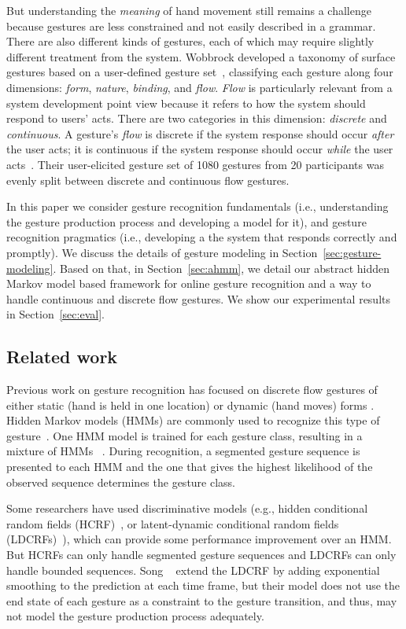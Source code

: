 \documentclass[10pt,twocolumn,letterpaper]{article}
\begin{document}
But understanding the \textit{meaning} of hand movement still remains a challenge because gestures are less constrained and not
easily described in a grammar. There are also different kinds of gestures, each of which may 
require slightly different treatment from the system. Wobbrock \etal developed a taxonomy of surface gestures based on a user-defined
gesture set~\cite{Wobbrock09}, classifying each gesture along four dimensions: 
\textit{form}, \textit{nature}, \textit{binding}, and \textit{flow}. \textit{Flow} is particularly relevant from a system development
point view because it refers to how the system should respond to users' acts. 
There are two categories in this dimension: \textit{discrete} and 
\textit{continuous}. A gesture's \textit{flow} is discrete if the system response
should occur \textit{after} the user acts; it is continuous if the system response
should occur \textit{while} the user acts~\cite{Wobbrock09}. Their user-elicited
gesture set of 1080 gestures from 20 participants was evenly split between discrete and continuous flow 
gestures.

In this paper we consider gesture recognition fundamentals (i.e., understanding the gesture production process and developing a model for it), and 
gesture recognition pragmatics (i.e., developing a 
the system that responds correctly and promptly). We discuss the 
details of gesture modeling in Section~\ref{sec:gesture-modeling}. Based on that, in Section~\ref{sec:ahmm}, we detail 
our abstract hidden Markov model based framework for online gesture recognition and a way to
handle continuous and discrete flow gestures. We show our experimental results in Section~\ref{sec:eval}.

\subsection{Related work}
Previous work on gesture recognition has focused on discrete flow gestures of either
static (hand is held in one location) or dynamic (hand moves) forms \cite{suryanarayan10, song12}. Hidden Markov models (HMMs) are commonly used
to recognize this type of gesture~\cite{Starner95}. 
One HMM model is trained for each gesture class, resulting in a mixture of HMMs~\cite{yin10} . During
recognition, a segmented gesture sequence is presented to each HMM and the one that gives the highest
likelihood of the observed sequence determines the gesture class. 

Some researchers have used discriminative models (e.g., hidden conditional 
random fields (HCRF)~\cite{wang06}, or latent-dynamic conditional random fields (LDCRFs)~\cite{morency07}), which can provide some 
performance improvement over an HMM. But HCRFs
can only handle segmented gesture sequences and LDCRFs can only handle bounded sequences. Song \etal~\cite{song12} extend the LDCRF by 
adding exponential smoothing to the prediction at each time frame, but their model does not
use the end state of each gesture as a constraint to the gesture transition, and thus, may not
model the gesture production process adequately.  
\end{document}
